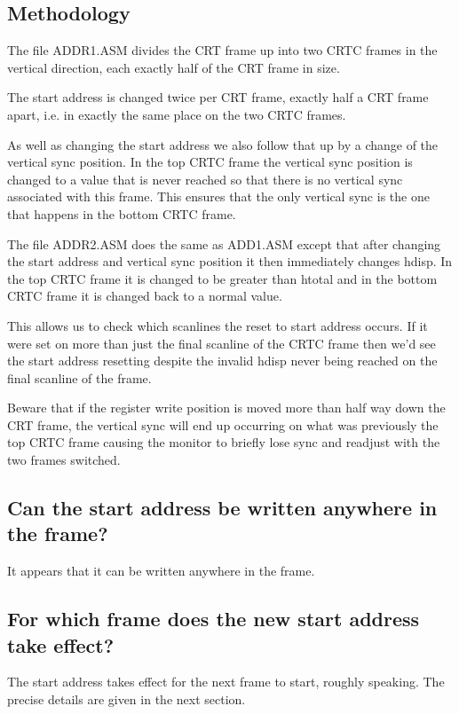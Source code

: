 \documentclass[a4paper,10pt]{amsart}
\begin{document}
\subsection{Methodology}

The file ADDR1.ASM divides the CRT frame up into two CRTC frames in the
vertical direction, each exactly half of the CRT frame in size.

The start address is changed twice per CRT frame, exactly half a CRT frame
apart, i.e. in exactly the same place on the two CRTC frames.

As well as changing the start address we also follow that up by a change of
the vertical sync position. In the top CRTC frame the vertical sync position
is changed to a value that is never reached so that there is no vertical sync
associated with this frame. This ensures that the only vertical sync is the
one that happens in the bottom CRTC frame.

The file ADDR2.ASM does the same as ADD1.ASM except that after changing the
start address and vertical sync position it then immediately changes hdisp.
In the top CRTC frame it is changed to be greater than htotal and in the
bottom CRTC frame it is changed back to a normal value.

This allows us to check which scanlines the reset to start address occurs.
If it were set on more than just the final scanline of the CRTC frame then
we'd see the start address resetting despite the invalid hdisp never being
reached on the final scanline of the frame.

Beware that if the register write position is moved more than half way down
the CRT frame, the vertical sync will end up occurring on what was previously
the top CRTC frame causing the monitor to briefly lose sync and readjust with
the two frames switched.

\subsection{Can the start address be written anywhere in the frame?}

It appears that it can be written anywhere in the frame.

\subsection{For which frame does the new start address take effect?}

The start address takes effect for the next frame to start, roughly speaking.
The precise details are given in the next section.
\end{document}
